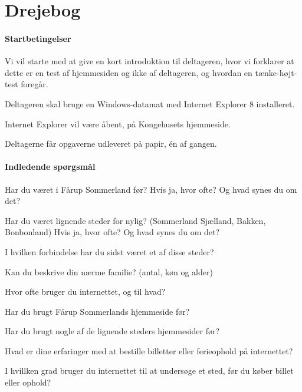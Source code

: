 \documentclass[10pt,a4paper]{article}      %
\begin{document}
\clearpage
\appendix
{}

\section{Drejebog}

\paragraph{Startbetingelser}
\begin{opgaver}
\item Vi vil starte med at give en kort introduktion til deltageren, hvor vi
forklarer at dette er en test af hjemmesiden og ikke af deltageren, og hvordan
en tænke-højt-test foregår.
\item Deltageren skal bruge en Windows-datamat med Internet Explorer 8
installeret.
\item Internet Explorer vil være åbent, på Kongehusets hjemmeside.
\item Deltagerne får opgaverne udleveret på papir, én af gangen.
\end{opgaver}

\paragraph{Indledende spørgsmål}
\begin{opgaver}
\item Har du været i Fårup Sommerland før? Hvis ja, hvor ofte? Og hvad synes du
om det?
\item Har du været lignende steder for nylig? (Sommerland Sjælland, Bakken,
Bonbonland) Hvis ja, hvor ofte? Og hvad synes du om det?
\item I hvilken forbindelse har du sidst været et af disse steder?
\item Kan du beskrive din nærme familie? (antal, køn og alder)
\item Hvor ofte bruger du internettet, og til hvad?
\item Har du brugt Fårup Sommerlands hjemmeside før?
\item Har du brugt nogle af de lignende steders hjemmesider før?
\item Hvad er dine erfaringer med at bestille billetter eller ferieophold på
internettet?
\item I hvillken grad bruger du internettet til at undersøge et sted, før du
køber billet eller ophold?
\end{opgaver}
\end{document}
